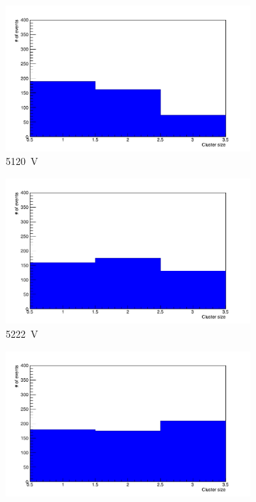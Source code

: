 	\begin{figure}[H]
		\begin{subfigure}{.33\linewidth}
		    \centering
			\includegraphics[width=\linewidth]{fig/chapt6/Muon-ClS-1D-5000-gRPC-INFN.pdf}
			\caption{\label{fig:cluster-size-1D:A} \SI{5120}{V}}
		\end{subfigure}
		\begin{subfigure}{.33\linewidth}
		    \centering
			\includegraphics[width=\linewidth]{fig/chapt6/Muon-ClS-1D-5100-gRPC-INFN.pdf}
			\caption{\label{fig:cluster-size-1D:B} \SI{5222}{V}}
		\end{subfigure}
		\begin{subfigure}{.33\linewidth}
		    \centering
			\includegraphics[width=\linewidth]{fig/chapt6/Muon-ClS-1D-5200-gRPC-INFN.pdf}

\end{subfigure}
\end{figure}
